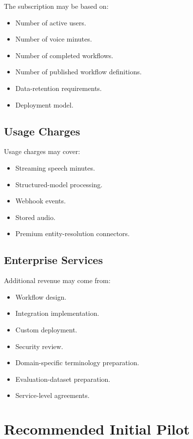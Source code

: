 \documentclass[11pt,a4paper]{article}
\begin{document}
The subscription may be based on:

\begin{itemize}
\item Number of active users.
\item Number of voice minutes.
\item Number of completed workflows.
\item Number of published workflow definitions.
\item Data-retention requirements.
\item Deployment model.
\end{itemize}

\subsection{Usage Charges}

Usage charges may cover:

\begin{itemize}
\item Streaming speech minutes.
\item Structured-model processing.
\item Webhook events.
\item Stored audio.
\item Premium entity-resolution connectors.
\end{itemize}

\subsection{Enterprise Services}

Additional revenue may come from:

\begin{itemize}
\item Workflow design.
\item Integration implementation.
\item Custom deployment.
\item Security review.
\item Domain-specific terminology preparation.
\item Evaluation-dataset preparation.
\item Service-level agreements.
\end{itemize}

\section{Recommended Initial Pilot}
\end{document}
